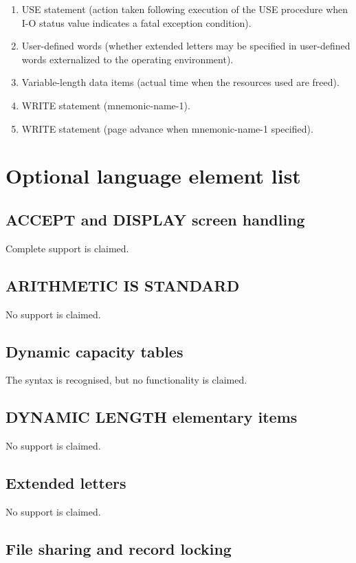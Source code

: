 \begin{enumerate}
\item USE statement (action taken following execution of the USE procedure when I-O status value indicates a fatal exception condition).
\item User-defined words (whether extended letters may be specified in user-defined words externalized to the operating environment).
\item Variable-length data items (actual time when the resources used are freed).
\item WRITE statement (mnemonic-name-1).
\item WRITE statement (page advance when mnemonic-name-1 specified).
\end{enumerate}

\section{Optional language element list}

\subsection{ACCEPT and DISPLAY screen handling}

Complete support is claimed.

\subsection{ARITHMETIC IS STANDARD}

No support is claimed.

\subsection{Dynamic capacity tables}

The syntax is recognised, but no functionality is claimed.

\subsection{DYNAMIC LENGTH elementary items}

No support is claimed.

\subsection{Extended letters}

No support is claimed.

\subsection{File sharing and record locking}

